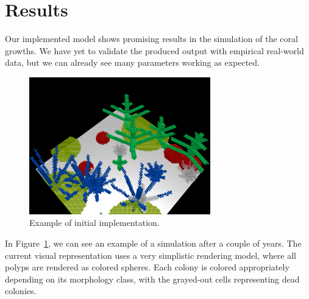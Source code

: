 \documentclass[9pt]{pnas-new}
\newcommand{\eg}{e.g., }
\begin{document}

\section*{Results}

Our implemented model shows promising results in the simulation of the coral growths. We have yet to validate the produced output with empirical real-world data, but we can already see many parameters working as expected.

\begin{figure}[!htb]
    \centering
    \includegraphics[width=0.7\textwidth]{fig/simulation_2.png}
    \caption{Example of initial implementation.}
    \label{fig:simulation}
\end{figure}

In Figure~\ref{fig:simulation}, we can see an example of a simulation after a couple of years. The current visual representation uses a very simplistic rendering model, where all polyps are rendered as colored spheres. Each colony is colored appropriately depending on its morphology class, with the grayed-out cells representing dead colonies. 
\end{document}
